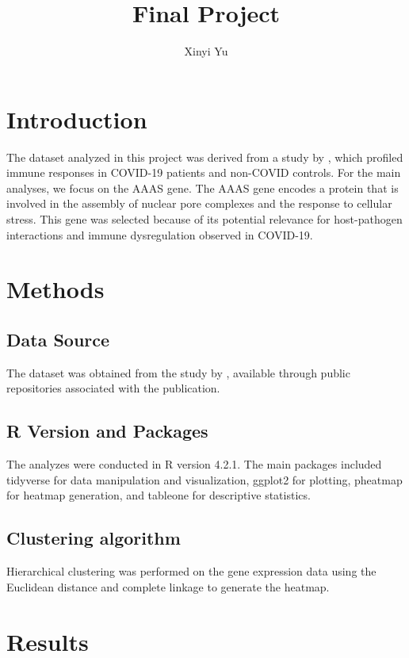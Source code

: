 \documentclass{article}
\title{Final Project}
\author{Xinyi Yu}
\begin{document}
\maketitle

\section{Introduction}

The dataset analyzed in this project was derived from a study by \cite{overmyer_large-scale_2021}, which profiled immune responses in COVID-19 patients and non-COVID controls. For the main analyses, we focus on the AAAS gene. The AAAS gene encodes a protein that is involved in the assembly of nuclear pore complexes and the response to cellular stress. This gene was selected because of its potential relevance for host-pathogen interactions and immune dysregulation observed in COVID-19.


\section{Methods}

\subsection{Data Source}

The dataset was obtained from the study by \cite{overmyer_large-scale_2021}, available through public repositories associated with the publication.

\subsection{R Version and Packages}

The analyzes were conducted in R version 4.2.1. The main packages included tidyverse for data manipulation and visualization, ggplot2 for plotting, pheatmap for heatmap generation, and tableone for descriptive statistics.

\subsection{Clustering algorithm}

Hierarchical clustering was performed on the gene expression data using the Euclidean distance and complete linkage to generate the heatmap.

\section{Results}
\end{document}

